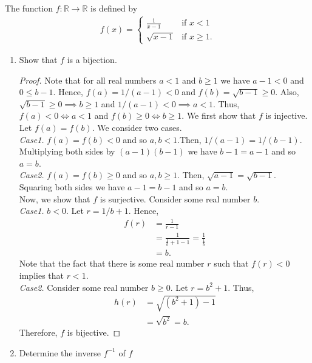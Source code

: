\documentclass[12pt]{article}
\newcommand{\R}{\mathbb{R}}
\newenvironment{problem}[2][Problem]{\begin{trivlist} \item[\hskip \labelsep {\bfseries #1}\hskip \labelsep {\bfseries #2.}]}{\end{trivlist}}
\begin{document}
    \begin{problem}{57}
      The function $f:\R\to \R$ is defined by
    \begin{align*}
      f(x) =
    \begin{cases}
      \frac{1}{x-1} &\text{if }x<1\\
      \sqrt{x-1} &\text{if }x\geq1.
    \end{cases}
    \end{align*}
    \begin{enumerate}
      \item Show that $f$ is a bijection.
    \begin{proof}
      Note that for all real numbers $a<1$ and $b\geq 1$ we have $a-1<0$ and $0\leq b-1$. Hence, $f(a) = 1/(a-1) < 0$ and $f(b) = \sqrt{b-1}\geq 0$. Also, $\sqrt{b-1} \geq 0 \implies b\geq 1$ and $1/(a-1) <0 \implies a<1$. Thus, $f(a) <0 \iff a<1$ and $f(b) \geq 0 \iff b\geq 1$. We first show that $f$ is injective. Let $f(a)=f(b)$. We consider two cases.\\

      \textit{Case1.} $f(a)=f(b)<0$ and so $a,b<1$.Then, $1/(a-1) = 1/(b-1)$. Multiplying both sides by $(a-1)(b-1)$ we have $b-1=a-1$ and so $a=b$.\\
      \textit{Case2.} $f(a)=f(b) \geq 0$ and so $a,b\geq 1$. Then, $\sqrt{a-1} = \sqrt{b-1}$. Squaring both sides we have $a-1=b-1$ and so $a=b$.\\
      
      Now, we show that $f$ is surjective. Consider some real number $b$.\\
      \textit{Case1.} $b<0$. Let $r=1/b +1$. Hence,  
    \begin{align*}
      f(r) &= \frac{1}{r-1}\\
      &= \frac{1}{\frac{1}{b}+1-1} = \frac{1}{\frac{1}{b}}\\
      &= b.
    \end{align*}
    Note that the fact that there is some real number $r$ such that $f(r)<0$ implies that $r<1$.\\

    \textit{Case2.} Consider some real number $b\geq 0$. Let $r=b^{2}+1$. Thus,
    \begin{align*}
      h(r) &= \sqrt{(b^{2}+1)-1}\\
      &= \sqrt{b^{2}} = b.
    \end{align*}
    Therefore, $f$ is bijective.
    \end{proof}
      \item Determine the inverse $f^{-1}$ of $f$
    \end{enumerate}
    \end{problem}


       
\end{document}
